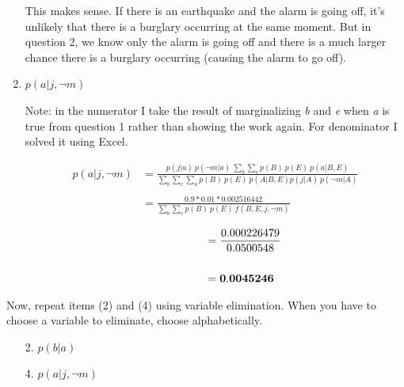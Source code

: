 \documentclass[fleqn]{hw}
\begin{document}
\begin{enumerate}
This makes sense. If there is an earthquake and the alarm is going off, it's unlikely that there is a burglary occurring at the same moment. But in question 2, we know only the alarm is going off and there is a much larger chance there is a burglary occurring (causing the alarm to go off).

\item $p(a | j,\lnot m)$

Note: in the numerator I take the result of marginalizing {\it b} and {\it e} when {\it a} is true from question 1 rather than showing the work again. For denominator I solved it using Excel.

\begin{align*}
p(a | j, \lnot m) & = \frac{p(j | a) \ p(\lnot m | a) \ \sum_{b} \sum_{e} p(B) \ p(E) \ p(a | B, E)}{\sum_{b} \sum_{e} \sum_{a} p(B) \ p(E) \ p(A | B, E) p(j | A) \ p(\lnot m | A)} \\ \\ 
&= \frac{0.9 * 0.01 * 0.002516442}{\sum_{b} \sum_{e} p(B) \ p(E) \ f(B, E, j, \lnot m)}
\end{align*}

\begin{align*}
\qquad \qquad \quad &= \frac{0.000226479}{0.0500548} \\ \\
&= {\bf 0.0045246}
\end{align*}


\end{enumerate}

Now, repeat items (2) and (4) using variable elimination.  When you
have to choose a variable to eliminate, choose alphabetically.

\begin{enumerate}
\item[2.] $p(b | a)$
\item[4.] $p(a|j, \lnot m)$	
\end{enumerate}
\end{document}
